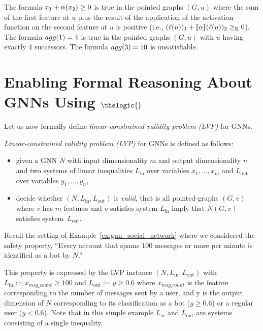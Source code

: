 \begin{example}
The formula $x_1 + \alpha(x_2) \geq 0$ is true in the pointed graphs $(G, u)$ where the sum of the first feature at $u$ plus the result of the application of the activation function on the second feature at $u$ is positive (i.e., $(\ell(u))_1 + [\![\alpha]\!](\ell(u))_2 \geq_{\mathbb K} 0$).
The formula $agg(1) = 4$ is true in the pointed graphs $(G,u)$ with $u$ having exactly $4$ successors. The formula $agg(3) = 10$ is unsatisfiable.
\end{example}

\section{Enabling Formal Reasoning About GNNs Using $\thelogic{}$}
\label{sec:gnntologic}


Let us now formally define \emph{linear-constrained validity problem (LVP)} for GNNs.

\begin{definition}
\emph{Linear-constrained validity problem (LVP)} for GNNs is defined as follows:
    \begin{itemize}
        \item given a GNN $N$ with input dimensionality $m$ and output dimensionality $n$
and two systems of linear inequalities $L_{\text{in}}$ over variables $x_1, \dotsc, x_m$ and 
$L_{\text{out}}$ over variables $y_1, \dotsc, y_n$,
\item decide whether $(N, L_{\text{in}}, L_{\text{out}})$ is \emph{valid}, that is all pointed-graphs $(G,v)$ where $v$ has $m$ features and $v$ satisfies system $L_{\text{in}}$ imply that $N(G,v)$ satisfies system~$L_{\text{out}}$. 
    \end{itemize}
\end{definition} 




\begin{example}
Recall the setting of Example~\ref{ex:gnn_social_network} where we considered the safety property, “Every account that spams $100$ messages or more per minute is identified as a bot by $N$.” 

This property is expressed by the LVP instance $(N, L_{\text{in}}, L_{\text{out}})$ with
$L_{\text{in}} := x_{\textit{msg\_count}} \geq 100$ and $L_{\text{out}} := y \geq 0.6$
where $x_{\textit{msg\_count}}$ is the feature corresponding to the number of messages sent by a user, and y is the output dimension of $N$ corresponding to its classification as a bot ($y \geq 0.6$) or a regular user ($y < 0.6$). Note that in this simple example $L_{\text{in}} $ and $L_{\text{out}}$ are systems consisting of a single inequality.
\end{example}

